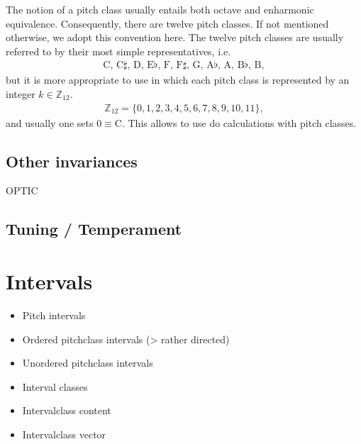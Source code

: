 \documentclass[letterpaper,10pt,english]{sphinxmanual}
\begin{document}
The notion of a pitch class usually entails both octave and enharmonic equivalence.
Consequently, there are twelve pitch classes. If not mentioned otherwise, we adopt this convention here.
The twelve pitch classes are usually referred to by their most simple representatives, i.e.
\begin{equation*}
\begin{split}\text{C, C$\sharp$, D, E$\flat$, F, F$\sharp$, G, A$\flat$, A, B$\flat$, B},\end{split}
\end{equation*}
but it is more appropriate to use  in which each pitch class is represented
by an integer \(k \in \mathbb{Z}_{12}\).
\begin{equation*}
\begin{split}\mathbb{Z}_{12}=\{0, 1, 2, 3, 4, 5, 6, 7, 8, 9, 10, 11\},\end{split}
\end{equation*}
and usually one sets \(0\equiv \text{C}\). This allows to use 
do calculations with pitch classes.


\subsection{Other invariances}
\label{\detokenize{1_fundamentals:other-invariances}}
OPTIC


\subsection{Tuning / Temperament}
\label{\detokenize{1_fundamentals:tuning-temperament}}

\section{Intervals}
\label{\detokenize{1_fundamentals:intervals}}\label{\detokenize{1_fundamentals:id1}}\begin{itemize}
\item {} 
Pitch intervals

\item {} 
Ordered pitch\sphinxhyphen{}class intervals (\sphinxhyphen{}\textgreater{} rather directed)

\item {} 
Unordered pitch\sphinxhyphen{}class intervals

\item {} 
Interval classes

\item {} 
Interval\sphinxhyphen{}class content

\item {} 
Interval\sphinxhyphen{}class vector

\end{itemize}
\end{document}
